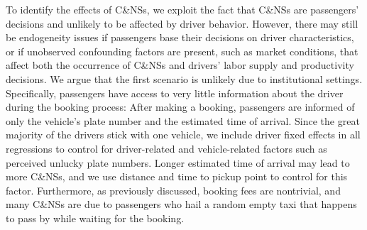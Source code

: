 \documentclass[reviewmode]{restud}
\begin{document}
To identify the effects of C\&NSs, we exploit the fact that C\&NSs are passengers' decisions and unlikely to be affected by driver behavior. However, there may still be endogeneity issues if passengers base their decisions on driver characteristics, or if unobserved confounding factors are present, such as market conditions, that affect both the occurrence of C\&NSs and drivers' labor supply and productivity decisions. We argue that the first scenario is unlikely due to institutional settings. Specifically, passengers have access to very little information about the driver during the booking process: After making a booking, passengers are informed of only the vehicle's plate number and the estimated time of arrival. Since the great majority of the drivers stick with one vehicle, we include driver fixed effects in all regressions to control for driver-related and vehicle-related factors such as perceived unlucky plate numbers. Longer estimated time of arrival may lead to more C\&NSs, and we use distance and time to pickup point to control for this factor. 
Furthermore, as previously discussed, booking fees are nontrivial, and many C\&NSs are due to passengers who hail a random empty taxi that happens to pass by while waiting for the booking. 
\end{document}
